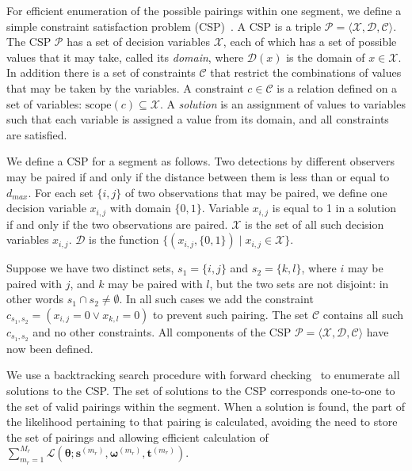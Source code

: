 \documentclass[useAMS, usenatbib, referee]{biom}\usepackage[]{graphicx}\usepackage[]{color}
\begin{document}
For efficient enumeration of the possible pairings within one segment, we define a simple constraint satisfaction problem (CSP)~\cite[Chapter 6]{russell-norvig-aima3}. A CSP is a triple \(\mathcal{P}=\langle \mathcal{X}, \mathcal{D}, \mathcal{C} \rangle\).  The CSP \(\mathcal{P}\) has a set of decision variables \(\mathcal{X}\), each of which has a set of possible values that it may take, called its \textit{domain}, where \(\mathcal{D}(x)\) is the domain of \(x \in \mathcal{X}\). In addition there is a set of constraints \(\mathcal{C}\) that restrict the combinations of values that may be taken by the variables. A constraint \(c\in \mathcal{C}\) is a relation defined on a set of variables: \(\mathrm{scope}(c)\subseteq \mathcal{X}\). A \textit{solution} is an assignment of values to variables such that each variable is assigned a value from its domain, and all constraints are satisfied.

We define a CSP for a segment as follows. Two detections by different observers may be paired if and only if the distance between them is less than or equal to \(d_{max}\). For each set \(\{i,j\}\) of two observations that may be paired, we define one decision variable \(x_{i,j}\) with domain \(\{0,1\}\). Variable \(x_{i,j}\) is equal to 1 in a solution if and only if the two observations are paired. \(\mathcal{X}\) is the set of all such decision variables \(x_{i,j}\). \(\mathcal{D}\) is the function \(\{ (x_{i,j}, \{0,1\})  \mid  x_{i,j} \in \mathcal{X} \}\).


Suppose we have two distinct sets, \(s_1=\{i,j\}\) and \(s_2=\{k,l\}\), where  \(i\) may be paired with \(j\), and \(k\) may be paired with \(l\), but the two sets are not disjoint: in other words \(s_1 \cap s_2 \ne \emptyset\). In all such cases we add the constraint \(c_{s_1,s_2} = (x_{i,j} = 0 \vee x_{k,l} = 0)\) to prevent such pairing. The set \(\mathcal{C}\) contains all such \(c_{s_1,s_2}\) and no other constraints.  All components of the CSP \(\mathcal{P}=\langle \mathcal{X},\mathcal{D},\mathcal{C} \rangle\) have now been defined.

We use a backtracking search procedure with forward checking~\cite[Chapter 6]{russell-norvig-aima3} to enumerate all solutions to the CSP. The set of solutions to the CSP corresponds one-to-one to the set of valid pairings within the segment. When a solution is found, the part of the likelihood pertaining to that pairing is calculated, avoiding the need to store the set of pairings and allowing efficient calculation of $\sum_{m_r=1}^{M_r}\mathcal{L}\left(\bm{\theta};\bm{s}^{(m_r)},\bm{\omega}^{(m_r)},\bm{t}^{(m_r)}\right)$.
\end{document}
